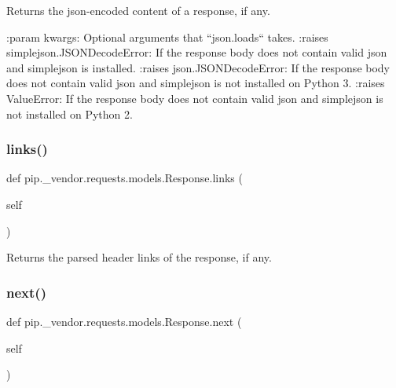 \begin{DoxyVerb}Returns the json-encoded content of a response, if any.

:param \*\*kwargs: Optional arguments that ``json.loads`` takes.
:raises simplejson.JSONDecodeError: If the response body does not
    contain valid json and simplejson is installed.
:raises json.JSONDecodeError: If the response body does not contain
    valid json and simplejson is not installed on Python 3.
:raises ValueError: If the response body does not contain valid
    json and simplejson is not installed on Python 2.        
\end{DoxyVerb}
 \mbox{\label{classpip_1_1__vendor_1_1requests_1_1models_1_1Response_a15dba82018e412fafd2c94fb43548e77}} 
\subsubsection{\texorpdfstring{links()}{links()}}
{\footnotesize\ttfamily def pip.\+\_\+vendor.\+requests.\+models.\+Response.\+links (\begin{DoxyParamCaption}\item[{}]{self }\end{DoxyParamCaption})}

\begin{DoxyVerb}Returns the parsed header links of the response, if any.\end{DoxyVerb}
 \mbox{\label{classpip_1_1__vendor_1_1requests_1_1models_1_1Response_a112b82fda481c7e3dd33af4f80806a6c}} 
\subsubsection{\texorpdfstring{next()}{next()}}
{\footnotesize\ttfamily def pip.\+\_\+vendor.\+requests.\+models.\+Response.\+next (\begin{DoxyParamCaption}\item[{}]{self }\end{DoxyParamCaption})}

